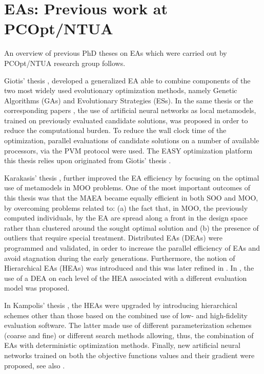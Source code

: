    

\section{EAs: Previous work at PCOpt/NTUA} %
\label{PRW}
An overview of previous PhD theses on EAs which were carried out by PCOpt/NTUA research group follows. 

Giotis' thesis \cite{phd_Giotis}, developed a generalized EA able to combine components of the two most widely used evolutionary optimization methods, namely Genetic Algorithms (GAs) and Evolutionary Strategies (ESs). In the same thesis or the corresponding papers \cite{kn:Emm2002,LTT_2_018,LTT_2_023}, the use of artificial neural networks as local metamodels, trained on previously evaluated candidate solutions, was proposed in order to reduce the computational burden. To reduce the wall clock time of the optimization, parallel evaluations of candidate solutions on a number of available processors, via the PVM protocol were used. The EASY optimization platform this thesis relies upon originated from Giotis' thesis \cite{phd_Giotis}.   

Karakasis' thesis \cite{phd_Karakasis}, further improved the EA efficiency by focusing on the optimal use of metamodels in MOO problems. One of the most important outcomes of this thesis was that the MAEA became equally efficient in both SOO and MOO, by overcoming problems related to: (a) the fact that, in MOO, the previously computed individuals, by the EA are spread along a front in the design space rather than clustered around the sought optimal solution and (b) the presence of outliers that require special treatment. Distributed EAs (DEAs) were programmed and validated, in order to increase the parallel efficiency of EAs and avoid stagnation during the early generations. Furthermore, the notion of Hierarchical EAs (HEAs) was introduced and this  was later refined in \cite{phd_Kampolis}.    In \cite{phd_Karakasis}, the use of a DEA on each level of the HEA associated with a different evaluation model was proposed.

In Kampolis' thesis \cite{phd_Kampolis}, the HEAs were upgraded by introducing hierarchical schemes other than those based on the combined use of low- and high-fidelity evaluation software. The latter made use of different parameterization schemes (coarse and fine) or different search methods allowing, thus, the combination of EAs with deterministic optimization methods. Finally, new artificial neural networks trained on both the objective functions values and their gradient were proposed, see also \cite{LTT_2_026}.          

